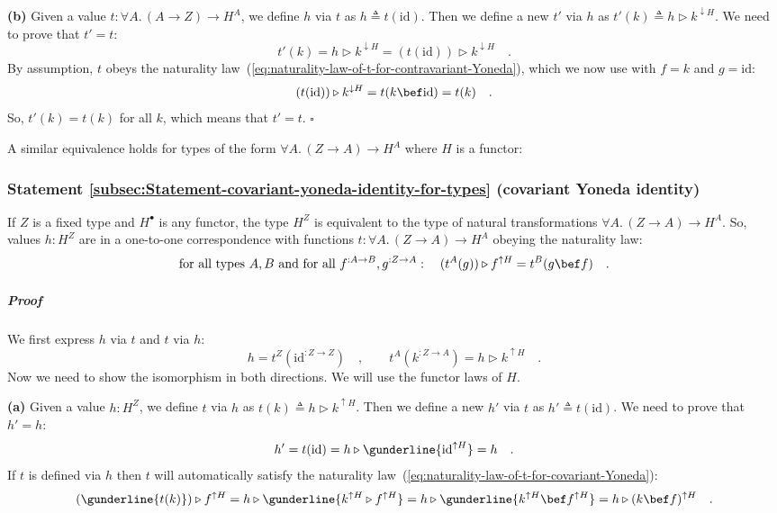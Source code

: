 \textbf{(b)} Given a value $t:\forall A.\,(A\rightarrow Z)\rightarrow H^{A}$,
we define $h$ via $t$ as $h\triangleq t(\text{id})$. Then we define
a new $t'$ via $h$ as $t'(k)\triangleq h\triangleright k^{\downarrow H}$.
We need to prove that $t'=t$:
\[
t'(k)=h\triangleright k^{\downarrow H}=(t(\text{id}))\triangleright k^{\downarrow H}\quad.
\]
By assumption, $t$ obeys the naturality law~(\ref{eq:naturality-law-of-t-for-contravariant-Yoneda}),
which we now use with $f=k$ and $g=\text{id}$:
\[
(t(\text{id}))\triangleright k^{\downarrow H}=t(k\bef\text{id})=t(k)\quad.
\]
So, $t'(k)=t(k)$ for all $k$, which means that $t'=t$. $\square$

A similar equivalence holds for types of the form $\forall A.\,(Z\rightarrow A)\rightarrow H^{A}$
where $H$ is a functor:

\subsubsection{Statement \label{subsec:Statement-covariant-yoneda-identity-for-types}\ref{subsec:Statement-covariant-yoneda-identity-for-types}
(covariant Yoneda identity)}

If $Z$ is a fixed type and $H^{\bullet}$ is any functor, the type
$H^{Z}$ is equivalent to the type of natural transformations $\forall A.\,(Z\rightarrow A)\rightarrow H^{A}$.
So, values $h:H^{Z}$ are in a one-to-one correspondence with functions
$t:\forall A.\,(Z\rightarrow A)\rightarrow H^{A}$ obeying the naturality
law:
\begin{equation}
\text{for all types }A,B\text{ and for all }f^{:A\rightarrow B},g^{:Z\rightarrow A}:\quad(t^{A}(g))\triangleright f^{\uparrow H}=t^{B}(g\bef f)\quad.\label{eq:naturality-law-of-t-for-covariant-Yoneda}
\end{equation}
 

\subparagraph{Proof}

We first express $h$ via $t$ and $t$ via $h$:
\[
h=t^{Z}(\text{id}^{:Z\rightarrow Z})\quad,\quad\quad t^{A}(k^{:Z\rightarrow A})=h\triangleright k^{\uparrow H}\quad.
\]
 Now we need to show the isomorphism in both directions. We will use
the functor laws of $H$.

\textbf{(a)} Given a value $h:H^{Z}$, we define $t$ via $h$ as
$t(k)\triangleq h\triangleright k^{\uparrow H}$. Then we define a
new $h'$ via $t$ as $h'\triangleq t(\text{id})$. We need to prove
that $h'=h$:
\[
h'=t(\text{id})=h\triangleright\gunderline{\text{id}^{\uparrow H}}=h\quad.
\]
If $t$ is defined via $h$ then $t$ will automatically satisfy the
naturality law~(\ref{eq:naturality-law-of-t-for-covariant-Yoneda}):
\[
(\gunderline{t(k)})\triangleright f^{\uparrow H}=h\triangleright\gunderline{k^{\uparrow H}\triangleright f^{\uparrow H}}=h\triangleright\gunderline{k^{\uparrow H}\bef f^{\uparrow H}}=h\triangleright(k\bef f)^{\uparrow H}\quad.
\]

